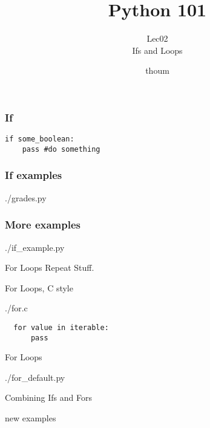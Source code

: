 \documentclass{beamer}
\title{Python 101}
\subtitle{Lec02 \\ Ifs and Loops}
\author{thoum}
\begin{document}
\frame{\titlepage}

\begin{frame}[fragile]
\frametitle{If}
\begin{lstlisting}
if some_boolean:
    pass #do something
\end{lstlisting}
\end{frame}

\begin{frame}
\frametitle{If examples}
  \begin{lstinputlisting}
    {./grades.py}
  \end{lstinputlisting}
\end{frame}

\begin{frame}
\frametitle{More examples}
  \begin{lstinputlisting}
    {./if_example.py}
  \end{lstinputlisting}
\end{frame}

\begin{frame}{For Loops}
  Repeat Stuff.
\end{frame}

\begin{frame}{For Loops, C style}
  \begin{lstinputlisting}
    {./for.c}
  \end{lstinputlisting}
\end{frame}

\begin{frame}[fragile]
  \begin{lstlisting}
  for value in iterable:
      pass
  \end{lstlisting}
\end{frame}

\begin{frame}{For Loops}
  \begin{lstinputlisting}
    {./for_default.py}
  \end{lstinputlisting}
\end{frame}

\begin{frame}{Combining Ifs and Fors}
  \begin{lstinputlisting}
    new examples
  \end{lstinputlisting}
\end{frame}
\end{document}
